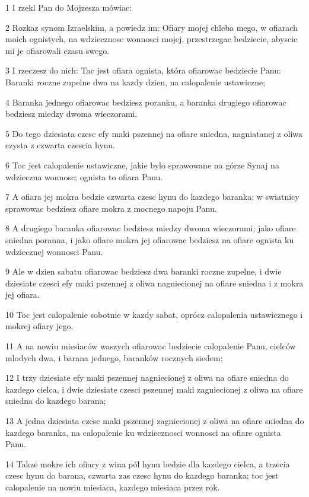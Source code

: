 \par 1 I rzekl Pan do Mojzesza mówiac:
\par 2 Rozkaz synom Izraelskim, a powiedz im: Ofiary mojej chleba mego, w ofiarach moich ognistych, na wdziecznosc wonnosci mojej, przestrzegac bedziecie, abyscie mi je ofiarowali czasu swego.
\par 3 I rzeczesz do nich: Tac jest ofiara ognista, która ofiarowac bedziecie Panu: Baranki roczne zupelne dwa na kazdy dzien, na calopalenie ustawiczne;
\par 4 Baranka jednego ofiarowac bedziesz poranku, a baranka drugiego ofiarowac bedziesz miedzy dwoma wieczorami.
\par 5 Do tego dziesiata czesc efy maki pszennej na ofiare sniedna, nagniatanej z oliwa czysta z czwarta czescia hynu.
\par 6 Toc jest calopalenie ustawiczne, jakie bylo sprawowane na górze Synaj na wdzieczna wonnosc; ognista to ofiara Panu.
\par 7 A ofiara jej mokra bedzie czwarta czesc hynu do kazdego baranka; w swiatnicy sprawowac bedziesz ofiare mokra z mocnego napoju Panu.
\par 8 A drugiego baranka ofiarowac bedziesz miedzy dwoma wieczorami; jako ofiare sniedna poranna, i jako ofiare mokra jej ofiarowac bedziesz na ofiare ognista ku wdziecznej wonnosci Panu.
\par 9 Ale w dzien sabatu ofiarowac bedziesz dwa baranki roczne zupelne, i dwie dziesiate czesci efy maki pszennej z oliwa nagniecionej na ofiare sniedna i z mokra jej ofiara.
\par 10 Toc jest calopalenie sobotnie w kazdy sabat, oprócz calopalenia ustawicznego i mokrej ofiary jego.
\par 11 A na nowiu miesiaców waszych ofiarowac bedziecie calopalenie Panu, cielców mlodych dwa, i barana jednego, baranków rocznych siedem;
\par 12 I trzy dziesiate efy maki pszennej nagniecionej z oliwa na ofiare sniedna do kazdego cielca, i dwie dziesiate czesci pszennej maki zagniecionej z oliwa na ofiare sniedna do kazdego barana;
\par 13 A jedna dziesiata czesc maki pszennej zagniecionej z oliwa na ofiare sniedna do kazdego baranka, na calopalenie ku wdziecznosci wonnosci na ofiare ognista Panu.
\par 14 Takze mokre ich ofiary z wina pól hynu bedzie dla kazdego cielca, a trzecia czesc hynu do barana, czwarta zas czesc hynu do kazdego baranka; toc jest calopalenie na nowiu miesiaca, kazdego miesiaca przez rok.
